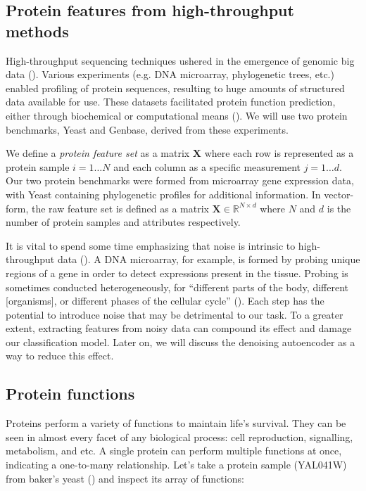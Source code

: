 \subsection{Protein features from high-throughput methods}

\par High-throughput sequencing techniques ushered in the emergence of genomic
big data (\cite{reuter2015high}). Various experiments (e.g. DNA microarray,
phylogenetic trees, etc.) enabled profiling of protein sequences, resulting to
huge amounts of structured data available for use. These datasets facilitated
protein function prediction, either through biochemical or computational means
(\cite{eisenberg2000protein, marcotte1999combined}). We will use two protein
benchmarks, Yeast and Genbase, derived from these experiments.

\par We define a \textit{protein feature set} as a matrix $\mathbf{X}$ where
each row is represented as a protein sample $i=1\dots N$ and each column as a
specific measurement $j=1 \dots d$. Our two protein benchmarks were formed from
microarray gene expression data, with Yeast containing phylogenetic profiles
for additional information. In vector-form, the raw feature set is defined as a
matrix $\mathbf{X} \in \mathbb{R}^{N \times d}$ where $N$ and $d$ is the number
of protein samples and attributes respectively.

\par It is vital to spend some time emphasizing that noise is intrinsic to
high-throughput data (\cite{hong2013estimating}). A DNA microarray, for
example, is formed by probing unique regions of a gene in order to detect
expressions present in the tissue. Probing is sometimes conducted
heterogeneously, for ``different parts of the body, different [organisms], or
different phases of the cellular cycle'' (\cite{nguyen2009noise}). Each step
has the potential to introduce noise that may be detrimental to our task. To a
greater extent, extracting features from noisy data can compound its effect and
damage our classification model. Later on, we will discuss the denoising
autoencoder as a way to reduce this effect.

\subsection{Protein functions}

\par Proteins perform a variety of functions to maintain life's survival. They
can be seen in almost every facet of any biological process: cell
reproduction, signalling, metabolism, and etc. A single protein can perform
multiple functions at once, indicating a one-to-many relationship. Let's take
a protein sample (YAL041W) from baker's yeast (\cite{elisseeff2001kernel})
and inspect its array of functions:

